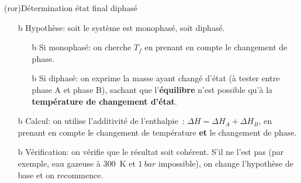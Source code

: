 \documentclass[../../main/main.tex]{subfiles}
\begin{document}
\begin{tcb*}(ror){Détermination état final diphasé}
	\begin{enumerate}[label=\sqenumi]
		\item[b]{Hypothèse}: soit le système est monophasé, soit diphasé.
		\begin{itemize}
			\item[b]{Si monophasé}: on cherche $T_f$ en prenant en compte le
			changement de phase.
			\item[b]{Si diphasé}: on exprime la masse ayant changé d'état (à tester
			entre phase A et phase B), sachant que l'\textbf{équilibre} n'est
			possible qu'à la \textbf{température de changement d'état}.
		\end{itemize}
		\item[b]{Calcul}: on utilise l'additivité de l'enthalpie~: $\Delta{H} =
			\Delta{H}_A + \Delta{H}_B$, en prenant en compte le changement de
		température \textbf{et} le changement de phase.
		\item[b]{Vérification}: on vérifie que le résultat soit cohérent. S'il ne
		l'est pas (par exemple, eau gazeuse à \SI{300}{K} et $\SI{1}{bar}$
		impossible), on change l'hypothèse de base et on recommence.
	\end{enumerate}
\end{tcb*}
\end{document}
